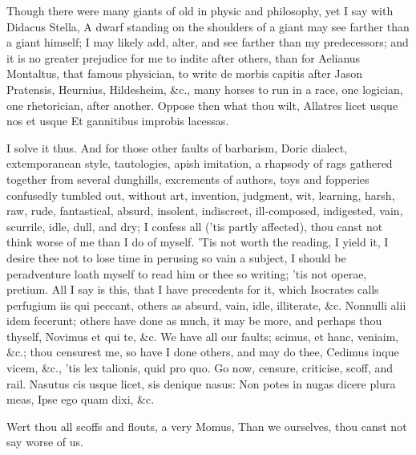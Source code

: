 {Though there were many giants of old in physic and philosophy, yet I
say with Didacus Stella, A dwarf standing on the shoulders of a
giant may see farther than a giant himself; I may likely add, alter,
and see farther than my predecessors; and it is no greater prejudice
for me to indite after others, than for Aelianus Montaltus, that famous
physician, to write de morbis capitis after Jason Pratensis, Heurnius,
Hildesheim, \&c., many horses to run in a race, one logician, one
rhetorician, after another. Oppose then what thou wilt,
Allatres licet usque nos et usque
Et gannitibus improbis lacessas.

I solve it thus. And for those other faults of barbarism, Doric
dialect, extemporanean style, tautologies, apish imitation, a rhapsody
of rags gathered together from several dunghills, excrements of
authors, toys and fopperies confusedly tumbled out, without art,
invention, judgment, wit, learning, harsh, raw, rude, fantastical,
absurd, insolent, indiscreet, ill-composed, indigested, vain, scurrile,
idle, dull, and dry; I confess all ('tis partly affected), thou canst
not think worse of me than I do of myself. 'Tis not worth the reading,
I yield it, I desire thee not to lose time in perusing so vain a
subject, I should be peradventure loath myself to read him or thee so
writing; 'tis not operae, pretium. All I say is this, that I have
precedents for it, which Isocrates calls perfugium iis qui
peccant, others as absurd, vain, idle, illiterate, \&c. Nonnulli alii
idem fecerunt; others have done as much, it may be more, and perhaps
thou thyself, Novimus et qui te, \&c. We have all our faults; scimus, et
hanc, veniaim, \&c.; thou censurest me, so have I done others, and
may do thee, Cedimus inque vicem, \&c., 'tis lex talionis, quid pro quo.
Go now, censure, criticise, scoff, and rail.
Nasutus cis usque licet, sis denique nasus:
Non potes in nugas dicere plura meas,
Ipse ego quam dixi, \&c.

Wert thou all scoffs and flouts, a very Momus,
Than we ourselves, thou canst not say worse of us.

}
